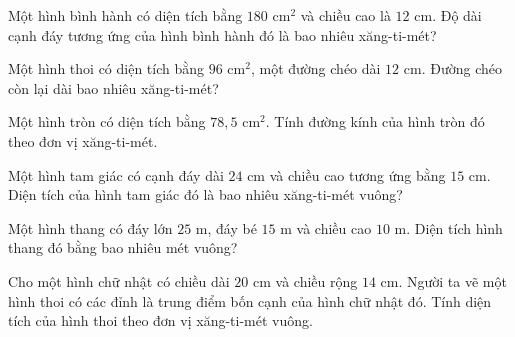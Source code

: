 \begin{ex} %
Một hình bình hành có diện tích bằng $180\text{ cm}^2$ và chiều cao là $12\text{ cm}$. Độ dài cạnh đáy tương ứng của hình bình hành đó là bao nhiêu xăng-ti-mét?
\end{ex}

\begin{ex} %
Một hình thoi có diện tích bằng $96\text{ cm}^2$, một đường chéo dài $12\text{ cm}$. Đường chéo còn lại dài bao nhiêu xăng-ti-mét?
\end{ex}

\begin{ex} %
Một hình tròn có diện tích bằng $78{,}5\text{ cm}^2$. Tính đường kính của hình tròn đó theo đơn vị xăng-ti-mét.
\end{ex}

\begin{ex} %
Một hình tam giác có cạnh đáy dài $24\text{ cm}$ và chiều cao tương ứng bằng $15\text{ cm}$. Diện tích của hình tam giác đó là bao nhiêu xăng-ti-mét vuông?
\end{ex}

\begin{ex} %
Một hình thang có đáy lớn $25\text{ m}$, đáy bé $15\text{ m}$ và chiều cao $10\text{ m}$. Diện tích hình thang đó bằng bao nhiêu mét vuông?
\end{ex}

\begin{ex} %
Cho một hình chữ nhật có chiều dài $20\text{ cm}$ và chiều rộng $14\text{ cm}$. Người ta vẽ một hình thoi có các đỉnh là trung điểm bốn cạnh của hình chữ nhật đó. Tính diện tích của hình thoi theo đơn vị xăng-ti-mét vuông.
\end{ex}
